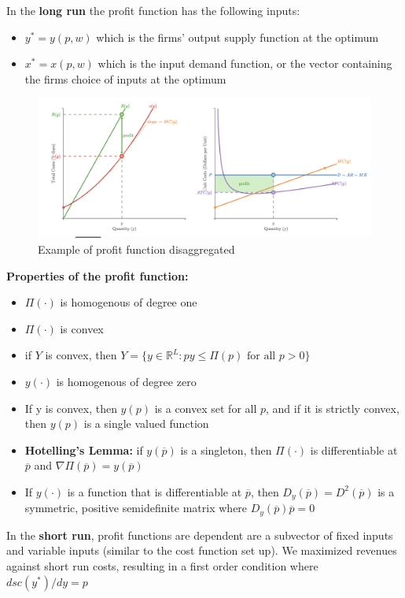\documentclass{article}
\begin{document}
In the \textbf{long run} the profit function has the following inputs: 
\begin{itemize}
    \item $y^* = y(p,w)$ which is the firms' output supply function at the optimum
    \item $x^* = x(p,w)$ which is the input demand function, or the vector containing the firms choice of inputs at the optimum
\end{itemize}

\begin{figure}[H]
    \centering
    \includegraphics[width=0.5\linewidth]{images/profit.png}
    \caption{Example of profit function disaggregated}
    \label{fig:profit-fx}
\end{figure}


\textbf{Properties of the profit function:}
\begin{itemize}
    \item $\Pi(\cdot)$ is homogenous of degree one
    \item $\Pi(\cdot)$ is convex
    \item if $Y$ is convex, then $Y = \{y \in \mathbb{R}^L : py \leq \Pi(p) \text{ for all } p > 0\}$
    \item $y(\cdot)$ is homogenous of degree zero
    \item If y is convex, then $y(p)$ is a convex set for all $p$, and if it is strictly convex, then $y(p)$ is a single valued function
    \item \textbf{Hotelling's Lemma:} if $y(\overline{p})$ is a singleton, then $\Pi(\cdot)$ is differentiable at $\overline{p}$ and $\nabla \Pi(\overline{p}) = y(\overline{p})$
    \item If $y(\cdot)$ is a function that is differentiable at $\overline{p}$, then $D_{y}(\overline{p}) = D^{2}(\overline{p})$ is a symmetric, positive semidefinite matrix where $D_{y}(\overline{p})\overline{p} = 0$
\end{itemize}
In the \textbf{short run}, profit functions are dependent are a subvector of fixed inputs and variable inputs (similar to the cost function set up). We maximized revenues against short run costs, resulting in a first order condition where $dsc(y^*)/dy = p$
\end{document}
